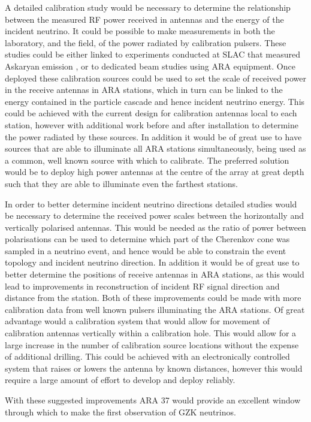 A detailed calibration study would be necessary to determine the relationship between the measured RF power received in antennas and the energy of the incident neutrino. It could be possible to make measurements in both the laboratory, and the field, of the power radiated by calibration pulsers. These studies could be either linked to experiments conducted at SLAC that measured Askaryan emission \cite{PhysRevLett.99.171101} , or to dedicated beam studies using ARA equipment. Once deployed these calibration sources could be used to set the scale of received power in the receive antennas in ARA stations, which in turn can be linked to the energy contained in the particle cascade and hence incident neutrino energy. This could be achieved with the current design for calibration antennas local to each station, however with additional work before and after installation to determine the power radiated by these sources. In addition it would be of great use to have sources that are able to illuminate all ARA stations simultaneously, being used as a common, well known source with which to calibrate. The preferred solution would be to deploy high power antennas at the centre of the array at great depth such that they are able to illuminate even the farthest stations. 

In order to better determine incident neutrino directions detailed studies would be necessary to determine the received power scales between the horizontally and vertically polarised antennas. This would be needed as the ratio of power between polarisations can be used to determine which part of the Cherenkov cone was sampled in a neutrino event, and hence would be able to constrain the event topology and incident neutrino direction. In addition it would be of great use to better determine the positions of receive antennas in ARA stations, as this would lead to improvements in reconstruction of incident RF signal direction and distance from the station. Both of these improvements could be made with more calibration data from well known pulsers illuminating the ARA stations. Of great advantage would a calibration system that would allow for movement of calibration antennas vertically within a calibration hole. This would allow for a large increase in the number of calibration source locations without the expense of additional drilling. This could be achieved with an electronically controlled system that raises or lowers the antenna by known distances, however this would require a large amount of effort to develop and deploy reliably.


With these suggested improvements ARA 37 would provide an excellent window through which to make the first observation of GZK neutrinos.
